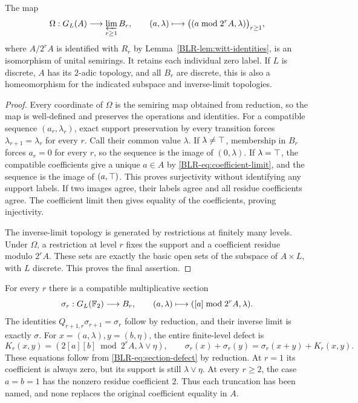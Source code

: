 \begin{theorem}\label{BLR-thm:support-limit}
The map
\begin{equation}\label{BLR-eq:support-limit}
 \Omega:G_L(A)\longrightarrow\varprojlim_{r\geq1}B_r,\qquad
 (a,\lambda)\longmapsto
 \bigl((a\bmod2^rA,\lambda)\bigr)_{r\geq1},
\end{equation}
where $A/2^rA$ is identified with $R_r$ by
Lemma~\ref{BLR-lem:witt-identities}, is an isomorphism of unital semirings.
It retains each individual zero label. If $L$ is discrete, $A$ has its
$2$-adic topology, and all $B_r$ are discrete, this is also a
homeomorphism for the indicated subspace and inverse-limit topologies.
\end{theorem}
\begin{proof}
Every coordinate of $\Omega$ is the semiring map obtained from reduction,
so the map is well-defined and preserves the operations and identities.
For a compatible sequence $(a_r,\lambda_r)$, exact support preservation
by every transition forces $\lambda_{r+1}=\lambda_r$ for every $r$.
Call their common value $\lambda$. If $\lambda\ne\top$, membership
in $B_r$ forces $a_r=0$ for every $r$, so the sequence is the image of
$(0,\lambda)$. If $\lambda=\top$, the compatible coefficients give a
unique $a\in A$ by \eqref{BLR-eq:coefficient-limit}, and the sequence is the
image of $(a,\top)$. This proves surjectivity without identifying any
support labels. If two images agree, their labels agree and all residue
coefficients agree. The coefficient limit then gives equality of the
coefficients, proving injectivity.

The inverse-limit topology is generated by restrictions at finitely
many levels. Under $\Omega$, a restriction at level $r$ fixes the
support and a coefficient residue modulo $2^rA$. These sets are exactly
the basic open sets of the subspace of $A\times L$, with $L$ discrete.
This proves the final assertion.
\end{proof}

For every $r$ there is a compatible multiplicative section
\[
 \sigma_r:G_L(\mathbb F_2)\longrightarrow B_r,\qquad
 (a,\lambda)\longmapsto([a]\bmod2^rA,\lambda).
\]
The identities $Q_{r+1,r}\sigma_{r+1}=\sigma_r$ follow by reduction,
and their inverse limit is exactly $\sigma$. For
$x=(a,\lambda),y=(b,\eta)$, the entire finite-level defect is
\[
 K_r(x,y)=(2[a][b]\bmod2^rA,\lambda\vee\eta),
 \qquad
 \sigma_r(x)+\sigma_r(y)=\sigma_r(x+y)+K_r(x,y).
\]
These equations follow from \eqref{BLR-eq:section-defect} by reduction. At
$r=1$ its coefficient is always zero, but its support is still
$\lambda\vee\eta$. At every $r\geq2$, the case $a=b=1$ has the
nonzero residue coefficient $2$. Thus each truncation has been named,
and none replaces the original coefficient equality in $A$.

